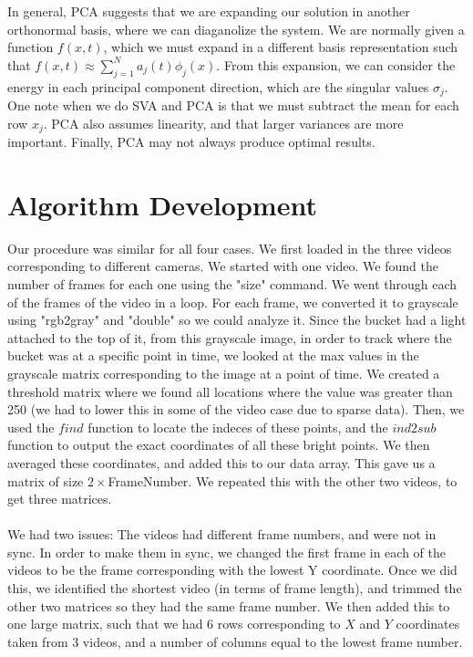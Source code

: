 \documentclass{article}
\begin{document}
In general, PCA suggests that we are expanding our solution in another orthonormal basis, where we can diaganolize the system. We are normally given a function $f(x,t)$, which we must expand in a different basis representation such that $f ( x , t ) \approx \sum _ { j = 1 } ^ { N } a _ { j } ( t ) \phi _ { j } ( x )$. From this expansion, we can consider the energy in each principal component direction, which are the singular values $\sigma_j$. One note when we do SVA and PCA is that we must subtract the mean for each row $x_j$. PCA also assumes linearity, and that larger variances are more important. Finally, PCA may not always produce optimal results.

\section*{\fontsize{19}{15}\selectfont Algorithm Development}
	Our procedure was similar for all four cases. We first loaded in the three videos corresponding to different cameras. We started with one video. We found the number of frames for each one using the "size" command. We went through each of the frames of the video in a loop. For each frame, we converted it to grayscale using "rgb2gray" and "double" so we could analyze it. Since the bucket had a light attached to the top of it, from this grayscale image, in order to track where the bucket was at a specific point in time, we looked at the max values in the grayscale matrix corresponding to the image at a point of time. We created a threshold matrix where we found all locations where the value was greater than 250 (we had to lower this in some of the video case due to sparse data). Then, we used the $find$ function to locate the indeces of these points, and the $ind2sub$ function to output the exact coordinates of all these bright points. We then averaged these coordinates, and added this to our data array. This gave us a matrix of size $2 \times$FrameNumber. We repeated this with the other two videos, to get three matrices. \\ \\
	We had two issues: The videos had different frame numbers, and were not in sync. In order to make them in sync, we changed the first frame in each of the videos to be the frame corresponding with the lowest Y coordinate. Once we did this, we identified the shortest video (in terms of frame length), and trimmed the other two matrices so they had the same frame number. We then added this to one large matrix, such that we had 6 rows corresponding to $X$ and $Y$ coordinates taken from 3 videos, and a number of columns equal to the lowest frame number.\\ \\
\end{document}
